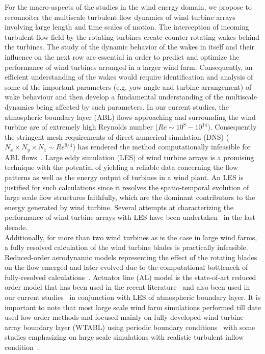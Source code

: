 For the macro-aspects of the studies in the wind energy domain, we propose to reconnoiter the multiscale turbulent flow dynamics of wind turbine arrays involving large length and time scales of motion. The interception of incoming turbulent flow field by the rotating turbines create counter-rotating wakes behind the turbines. The study of the dynamic behavior of the wakes in itself and their influence on the next row are essential in order to predict and optimize the performance of wind turbines arranged in a larger wind farm. Consequently, an efficient understanding of the wakes would require identification and analysis of some of the important parameters (e.g. yaw angle and turbine arrangement) of wake behaviour and then develop a fundamental understanding of the multiscale dynamics being affected by such parameters. In our current studies, the atmospheric boundary layer (ABL) flows approaching and surrounding the wind turbine are of extremely high Reynolds number ($Re \sim 10^8 - 10^{14})$. Consequently the stringent mesh requirements of direct numerical simulation (DNS) ($N_x\times N_y\times N_z \sim Re^{9/4}$) has rendered the method computationally infeasible for ABL flows~\cite{pope,chap,rey}. Large eddy simulation (LES) of wind turbine arrays is a promising technique with the potential of yielding a reliable data concerning the flow patterns as well as the energy output of turbines in a wind plant. An LES is justified for such calculations since it resolves the spatio-temporal evolution of large scale flow structures faithfully, which are the dominant contributors to the energy generated by wind turbine. Several attempts at characterizing the performance of wind turbine arrays with LES have been undertaken~\cite{ivanell,calaf,porte,churchfield, churchfield_2} in the last decade. \\
Additionally, for more than two wind turbines as is the case in large wind farms, a fully resolved calculation of the wind turbine blades is practically infeasible. Reduced-order aerodynamic models representing the effect of the rotating blades on the flow emerged and later evolved due to the computational bottleneck of fully-resolved calculations~\cite{rankine,glauert,ivanell,mikkelsen}. Actuator line (AL) model is the state-of-art reduced order model that has been used in the recent literature~\cite{mikkelsen,troldborg} and also been used in our current studies~\cite{peet2} in conjunction with LES of atmospheric boundary layer. It is important to note that most large scale wind farm simulations performed till date used low order methods and focused mainly on fully developed wind turbine array boundary layer (WTABL) using periodic boundary conditions~\cite{calaf,men2} with some studies emphasizing on large scale simulations with realistic turbulent inflow condition~\cite{porte2a,churchfield}. \\
